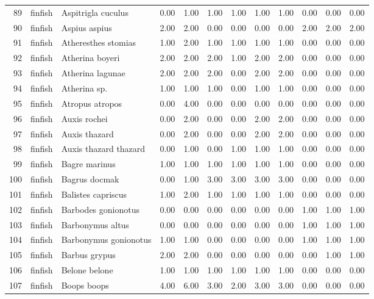 \begin{table}[ht]
\begin{tabular}{rllrrrrrrrrr}
  89 & finfish & Aspitrigla cuculus & 0.00 & 1.00 & 1.00 & 1.00 & 1.00 & 1.00 & 0.00 & 0.00 & 0.00 \\ 
  90 & finfish & Aspius aspius & 2.00 & 2.00 & 0.00 & 0.00 & 0.00 & 0.00 & 2.00 & 2.00 & 2.00 \\ 
  91 & finfish & Atheresthes stomias & 1.00 & 2.00 & 1.00 & 1.00 & 1.00 & 1.00 & 0.00 & 0.00 & 0.00 \\ 
  92 & finfish & Atherina boyeri & 2.00 & 2.00 & 2.00 & 1.00 & 2.00 & 2.00 & 0.00 & 0.00 & 0.00 \\ 
  93 & finfish & Atherina lagunae & 2.00 & 2.00 & 2.00 & 0.00 & 2.00 & 2.00 & 0.00 & 0.00 & 0.00 \\ 
  94 & finfish & Atherina sp. & 1.00 & 1.00 & 1.00 & 0.00 & 1.00 & 1.00 & 0.00 & 0.00 & 0.00 \\ 
  95 & finfish & Atropus atropos & 0.00 & 4.00 & 0.00 & 0.00 & 0.00 & 0.00 & 0.00 & 0.00 & 0.00 \\ 
  96 & finfish & Auxis rochei & 0.00 & 2.00 & 0.00 & 0.00 & 2.00 & 2.00 & 0.00 & 0.00 & 0.00 \\ 
  97 & finfish & Auxis thazard & 0.00 & 2.00 & 0.00 & 0.00 & 2.00 & 2.00 & 0.00 & 0.00 & 0.00 \\ 
  98 & finfish & Auxis thazard thazard & 0.00 & 1.00 & 0.00 & 1.00 & 1.00 & 1.00 & 0.00 & 0.00 & 0.00 \\ 
  99 & finfish & Bagre marinus & 1.00 & 1.00 & 1.00 & 1.00 & 1.00 & 1.00 & 0.00 & 0.00 & 0.00 \\ 
  100 & finfish & Bagrus docmak & 0.00 & 1.00 & 3.00 & 3.00 & 3.00 & 3.00 & 0.00 & 0.00 & 0.00 \\ 
  101 & finfish & Balistes capriscus & 1.00 & 2.00 & 1.00 & 1.00 & 1.00 & 1.00 & 0.00 & 0.00 & 0.00 \\ 
  102 & finfish & Barbodes gonionotus & 0.00 & 0.00 & 0.00 & 0.00 & 0.00 & 0.00 & 1.00 & 1.00 & 1.00 \\ 
  103 & finfish & Barbonymus altus & 0.00 & 0.00 & 0.00 & 0.00 & 0.00 & 0.00 & 1.00 & 1.00 & 1.00 \\ 
  104 & finfish & Barbonymus gonionotus & 1.00 & 1.00 & 0.00 & 0.00 & 0.00 & 0.00 & 1.00 & 1.00 & 1.00 \\ 
  105 & finfish & Barbus grypus & 2.00 & 2.00 & 0.00 & 0.00 & 0.00 & 0.00 & 0.00 & 1.00 & 1.00 \\ 
  106 & finfish & Belone belone & 1.00 & 1.00 & 1.00 & 1.00 & 1.00 & 1.00 & 0.00 & 0.00 & 0.00 \\ 
  107 & finfish & Boops boops & 4.00 & 6.00 & 3.00 & 2.00 & 3.00 & 3.00 & 0.00 & 0.00 & 0.00 \\ 

\end{tabular}
\end{table}
